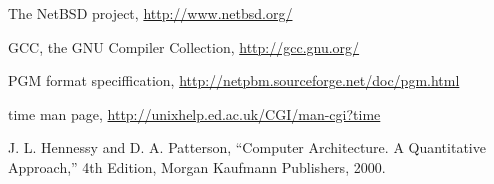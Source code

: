 \documentclass{article}
\begin{document}
\begin{thebibliography}{99}

	 The NetBSD project, \url{http://www.netbsd.org/}

	 GCC, the GNU Compiler Collection, \url{http://gcc.gnu.org/}

	 PGM format speciffication, \url{http://netpbm.sourceforge.net/doc/pgm.html}

	 time man page, \url{http://unixhelp.ed.ac.uk/CGI/man-cgi?time}

	 J. L. Hennessy and D. A. Patterson, ``Computer Architecture. A Quantitative
	Approach,'' 4th Edition, Morgan Kaufmann Publishers, 2000.

	\end{thebibliography}

\newpage
\end{document}
